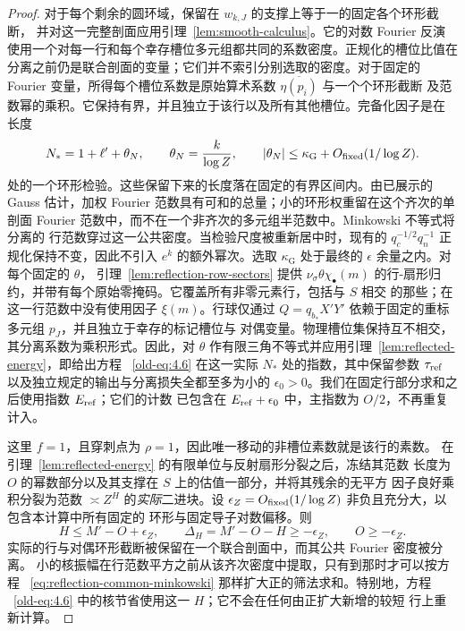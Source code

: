 \begin{proof}
对于每个剩余的圆环域，保留在 $w_{k,J}$ 的支撑上等于一的固定各个环形截断，
并对这一完整剖面应用引理~\ref{lem:smooth-calculus}。它的对数 Fourier 反演
使用一个对每一行和每个幸存槽位多元组都共同的系数密度。正规化的槽位比值在
分离之前仍是联合剖面的变量；它们并不索引分别选取的密度。对于固定的 Fourier
变量，所得每个槽位系数是原始算术系数 $\overline{\eta(p_i)}$ 与一个个环形截断
及范数幂的乘积。它保持有界，并且独立于该行以及所有其他槽位。完备化因子是在
长度
\[
 N_*=1+\ell'+\theta_N,\qquad
 \theta_N=\frac{k}{\log Z},\qquad
 |\theta_N|\le\kappa_{\mathrm G}+O_{\rm fixed}(1/\log Z).
\]
处的一个环形检验。这些保留下来的长度落在固定的有界区间内。由已展示的 Gauss
估计，加权 Fourier 范数具有可和的总量；小的环形权重留在这个齐次的单剖面
Fourier 范数中，而不在一个非齐次的多元组半范数中。Minkowski 不等式将分离的
行范数穿过这一公共密度。当检验尺度被重新居中时，现有的
$q_c^{-1/2}q_n^{-1}$ 正规化保持不变，因此不引入 $e^k$ 的额外幂次。选取
$\kappa_{\mathrm G}$ 处于最终的 $\epsilon$ 余量之内。对每个固定的 $\theta$，
引理~\ref{lem:reflection-row-sectors} 提供 $\nu_\sigma\theta\chi_\bullet(m)$
的行-扇形归约，并带有每个原始零掩码。它覆盖所有非零元素行，包括与 $S$ 相交
的那些；在这一行范数中没有使用因子 $\xi(m)$。行球仅通过
$Q=q_{b_*}X'Y'$ 依赖于固定的重标多元组 $p_J$，并且独立于幸存的标记槽位与
对偶变量。物理槽位集保持互不相交，其分离系数为乘积形式。因此，对 $\theta$
作有限三角不等式并应用引理~\ref{lem:reflected-energy}，即给出方程
~\eqref{old-eq:4.6} 在这一实际 $N_*$ 处的指数，其中保留参数
$\tau_{\rm ref}$ 以及独立规定的输出与分离损失全都至多为小的
$\epsilon_0>0$。我们在固定行部分求和之后使用指数 $E_{\rm ref}$；它们的计数
已包含在 $E_{\rm ref}+\epsilon_0$ 中，主指数为 $O/2$，不再重复计入。

这里 $f=1$，且穿刺点为 $\rho=1$，因此唯一移动的非槽位素数就是该行的素数。
在引理~\ref{lem:reflected-energy} 的有限单位与反射扇形分裂之后，冻结其范数
长度为 $O$ 的幂数部分以及其支撑在 $S$ 上的估值一部分，并将其残余的无平方
因子良好乘积分裂为范数 $\asymp Z^H$ 的\emph{实际}二进块。设
$\epsilon_Z=O_{\rm fixed}(1/\log Z)$ 非负且充分大，以包含本计算中所有固定的
环形与固定导子对数偏移。则
\[
 H\le M'-O+\epsilon_Z,\qquad
 \Delta_H=M'-O-H\ge-\epsilon_Z,\qquad O\ge-\epsilon_Z.
\]
实际的行与对偶环形截断被保留在一个联合剖面中，而其公共 Fourier 密度被分离。
小的核振幅在行范数平方之前从该齐次密度中提取，只有到那时才可以按方程
~\eqref{eq:reflection-common-minkowski} 那样扩大正的筛法求和。特别地，方程
~\eqref{old-eq:4.6} 中的核节省使用这一 $H$；它不会在任何由正扩大新增的较短
行上重新计算。


\end{proof}
